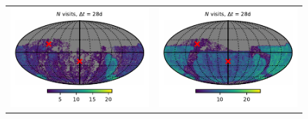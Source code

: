 \documentclass[preprintm,linenumbers]{aastex631}
\begin{document}
\begin{figure}
\begin{tabular}{@{}c@{}c@{}}
         \includegraphics{results/skymaps_cutout/skymaps_cutout_first_year_one_snap_v4_0_10yrs_db_noDD_noTwi_tscale-28_nside-256_doAllTemplateMetrics_reduceCount_g_noDD_noTwi.pdf} &
         \includegraphics{results/skymaps_cutout/skymaps_cutout_first_year_one_snap_v4_0_10yrs_db_noDD_noTwi_tscale-28_nside-256_doAllTemplateMetrics_reduceCount_r_noDD_noTwi.pdf} \\


\end{tabular}
\end{figure}
\end{document}
